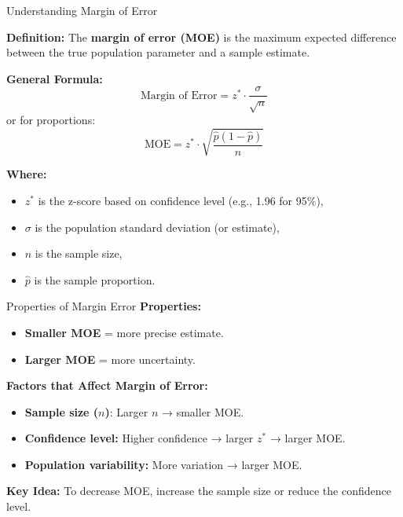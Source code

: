 \documentclass{beamer}
\begin{document}
\begin{frame}{Understanding Margin of Error}
\small

\textbf{Definition:}  
The \textbf{margin of error (MOE)} is the maximum expected difference between the true population parameter and a sample estimate.

\vspace{0.3cm}
\textbf{General Formula:}
\[
\text{Margin of Error} = z^* \cdot \frac{\sigma}{\sqrt{n}}
\]
or for proportions:
\[
\text{MOE} = z^* \cdot \sqrt{\frac{\hat{p}(1 - \hat{p})}{n}}
\]

\textbf{Where:}
\begin{itemize}
    \item $z^*$ is the z-score based on confidence level (e.g., 1.96 for 95\%),
    \item $\sigma$ is the population standard deviation (or estimate),
    \item $n$ is the sample size,
    \item $\hat{p}$ is the sample proportion.
\end{itemize}

\vspace{0.3cm}


\end{frame}

\begin{frame}{Properties of Margin Error}
    \textbf{Properties:}
\begin{itemize}
    \item \textbf{Smaller MOE} = more precise estimate.
    \item \textbf{Larger MOE} = more uncertainty.
\end{itemize}

\textbf{Factors that Affect Margin of Error:}
\begin{itemize}
    \item \textbf{Sample size ($n$)}: Larger $n$ → smaller MOE.
    \item \textbf{Confidence level:} Higher confidence → larger $z^*$ → larger MOE.
    \item \textbf{Population variability:} More variation → larger MOE.
\end{itemize}

\vspace{0.2cm}
\textbf{Key Idea:}  
To decrease MOE, increase the sample size or reduce the confidence level.
\end{frame}
\end{document}
